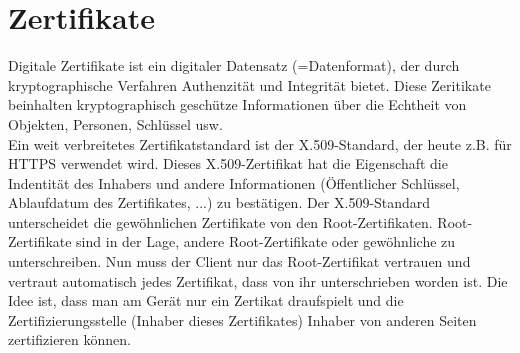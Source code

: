 \chapter{Zertifikate}

Digitale Zertifikate ist ein digitaler Datensatz (=Datenformat), der durch kryptographische Verfahren Authenzität und Integrität bietet. Diese Zeritikate beinhalten kryptographisch geschütze Informationen über die Echtheit von Objekten, Personen, Schlüssel usw.\\
Ein weit verbreitetes Zertifikatstandard ist der X.509-Standard, der heute z.B. für HTTPS verwendet wird. Dieses X.509-Zertifikat hat die Eigenschaft die Indentität des Inhabers und andere Informationen (Öffentlicher Schlüssel, Ablaufdatum des Zertifikates, ...) zu bestätigen. Der X.509-Standard unterscheidet die gewöhnlichen Zertifikate von den Root-Zertifikaten. Root-Zertifikate sind in der Lage, andere Root-Zertifikate oder gewöhnliche zu unterschreiben. Nun muss der Client nur das Root-Zertifikat vertrauen und vertraut automatisch jedes Zertifikat, dass von ihr unterschrieben worden ist. Die Idee ist, dass man am Gerät nur ein Zertikat draufspielt und die Zertifizierungsstelle (Inhaber dieses Zertifikates) Inhaber von anderen Seiten zertifizieren können.
